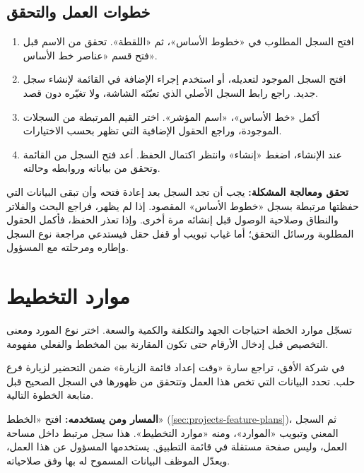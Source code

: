 \subsection{خطوات العمل والتحقق}
\begin{enumerate}
\item افتح السجل المطلوب في «خطوط الأساس»، ثم «اللقطة». تحقق من الاسم قبل فتح قسم «عناصر خط الأساس».
\item افتح السجل الموجود لتعديله، أو استخدم إجراء الإضافة في القائمة لإنشاء سجل جديد. راجع رابط السجل الأصلي الذي تعبّئه الشاشة، ولا تغيّره دون قصد.
\item أكمل «خط الأساس»، «اسم المؤشر». اختر القيم المرتبطة من السجلات الموجودة، وراجع الحقول الإضافية التي تظهر بحسب الاختيارات.
\item عند الإنشاء، اضغط «إنشاء» وانتظر اكتمال الحفظ. أعد فتح السجل من القائمة وتحقق من بياناته وروابطه وحالته.
\end{enumerate}

\textbf{تحقق ومعالجة المشكلة:} يجب أن تجد السجل بعد إعادة فتحه وأن تبقى البيانات التي حفظتها مرتبطة بسجل «خطوط الأساس» المقصود. إذا لم يظهر، فراجع البحث والفلاتر والنطاق وصلاحية الوصول قبل إنشائه مرة أخرى. وإذا تعذر الحفظ، فأكمل الحقول المطلوبة ورسائل التحقق؛ أما غياب تبويب أو قفل حقل فيستدعي مراجعة نوع السجل وإطاره ومرحلته مع المسؤول.

\clearpage
\section{موارد التخطيط}
\label{sec:projects-feature-planning-resources}

تسجّل موارد الخطة احتياجات الجهد والتكلفة والكمية والسعة. اختر نوع المورد ومعنى التخصيص قبل إدخال الأرقام حتى تكون المقارنة بين المخطط والفعلي مفهومة.

\begin{rcnote}
في شركة الأفق، تراجع سارة «وقت إعداد قائمة الزيارة» ضمن التحضير لزيارة فرع حلب. تحدد البيانات التي تخص هذا العمل وتتحقق من ظهورها في السجل الصحيح قبل متابعة الخطوة التالية.
\end{rcnote}

\textbf{المسار ومن يستخدمه:} افتح «الخطط» (\ref{sec:projects-feature-plans})، ثم السجل المعني وتبويب «الموارد»، ومنه «موارد التخطيط». هذا سجل مرتبط داخل مساحة العمل، وليس صفحة مستقلة في قائمة التطبيق. يستخدمها المسؤول عن هذا العمل، ويعدّل الموظف البيانات المسموح له بها وفق صلاحياته.

